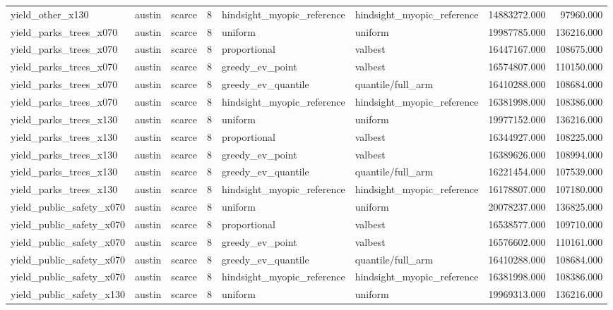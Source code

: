 \begin{tabular}{lllrllrr}
yield\_other\_x130 & austin & scarce & 8 & hindsight\_myopic\_reference & hindsight\_myopic\_reference & 14883272.000 & 97960.000 \\
yield\_parks\_trees\_x070 & austin & scarce & 8 & uniform & uniform & 19987785.000 & 136216.000 \\
yield\_parks\_trees\_x070 & austin & scarce & 8 & proportional & valbest & 16447167.000 & 108675.000 \\
yield\_parks\_trees\_x070 & austin & scarce & 8 & greedy\_ev\_point & valbest & 16574807.000 & 110150.000 \\
yield\_parks\_trees\_x070 & austin & scarce & 8 & greedy\_ev\_quantile & quantile/full\_arm & 16410288.000 & 108684.000 \\
yield\_parks\_trees\_x070 & austin & scarce & 8 & hindsight\_myopic\_reference & hindsight\_myopic\_reference & 16381998.000 & 108386.000 \\
yield\_parks\_trees\_x130 & austin & scarce & 8 & uniform & uniform & 19977152.000 & 136216.000 \\
yield\_parks\_trees\_x130 & austin & scarce & 8 & proportional & valbest & 16344927.000 & 108225.000 \\
yield\_parks\_trees\_x130 & austin & scarce & 8 & greedy\_ev\_point & valbest & 16389626.000 & 108994.000 \\
yield\_parks\_trees\_x130 & austin & scarce & 8 & greedy\_ev\_quantile & quantile/full\_arm & 16221454.000 & 107539.000 \\
yield\_parks\_trees\_x130 & austin & scarce & 8 & hindsight\_myopic\_reference & hindsight\_myopic\_reference & 16178807.000 & 107180.000 \\
yield\_public\_safety\_x070 & austin & scarce & 8 & uniform & uniform & 20078237.000 & 136825.000 \\
yield\_public\_safety\_x070 & austin & scarce & 8 & proportional & valbest & 16538577.000 & 109710.000 \\
yield\_public\_safety\_x070 & austin & scarce & 8 & greedy\_ev\_point & valbest & 16576602.000 & 110161.000 \\
yield\_public\_safety\_x070 & austin & scarce & 8 & greedy\_ev\_quantile & quantile/full\_arm & 16410288.000 & 108684.000 \\
yield\_public\_safety\_x070 & austin & scarce & 8 & hindsight\_myopic\_reference & hindsight\_myopic\_reference & 16381998.000 & 108386.000 \\
yield\_public\_safety\_x130 & austin & scarce & 8 & uniform & uniform & 19969313.000 & 136216.000 \\

\end{tabular}

